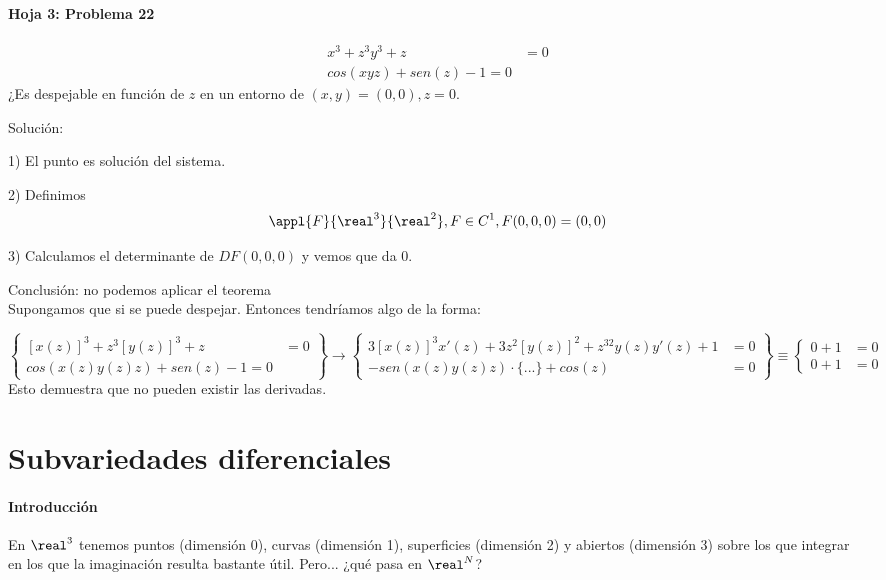 \paragraph{Hoja 3: Problema 22}

\[\begin{array}{cc}
   x^3+z^3y^3+z &= 0\\
   cos(xyz)+sen(z)-1 = 0
  \end{array}\]
 ¿Es despejable en función de $z$ en un entorno de $(x,y) = (0,0), z=0$.
 
 Solución:
 
 1) El punto es solución del sistema.
 
 2) Definimos \[\appl{F}{\real^3}{\real^2}, F\in C^1, F(0,0,0)=(0,0)\]
 
 3) Calculamos el determinante de $DF(0,0,0)$ y vemos que da $0$.
 
 Conclusión: no podemos aplicar el teorema\\
 Supongamos que si se puede despejar. Entonces tendríamos algo de la forma:

 \[\left\{\begin{array}{cc}
   [x(z)]^3+z^3[y(z)]^3+z &= 0\\
   cos(x(z)y(z)z)+sen(z)-1 = 0
  \end{array}\right\}\rightarrow \left\{ \begin{array}{cc}
               3[x(z)]^3x'(z) + 3z^2[y(z)]^2 + z^32y(z)y'(z) + 1 &=0\\
               -sen(x(z)y(z)z) \cdot\{...\} + cos(z) &= 0
              \end{array}\right\}
              \equiv\left\{
              \begin{array}{cc}
               0+1&=0\\
               0+1&=0
              \end{array}\right.\]
  Esto demuestra que no pueden existir las derivadas.

  
  \section{Subvariedades diferenciales}
  
  \paragraph{Introducción}
  
  En $\real^3$ tenemos puntos (dimensión 0), curvas (dimensión 1), superficies (dimensión 2) y abiertos (dimensión 3) sobre los que integrar en los que la imaginación resulta bastante útil. Pero... ¿qué pasa en $\real^N$? 
  
